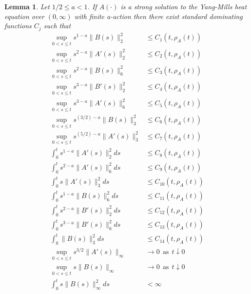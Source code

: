 \documentclass[12pt]{article}
\newtheorem{lemma}[theorem]{Lemma}
\numberwithin{equation}{section}
\begin{document}
\begin{lemma}\label{lemiby} 
Let $1/2 \le a <1$.  If $A(\cdot)$ is a strong solution to the 
      Yang-Mills heat equation over $(0, \infty)$  
   with finite a-action then  there 
      exist standard dominating functions $C_j$ such that
   \begin{align}
   \sup_{0< s \le t} s^{1-a} \|B(s)\|_2^2 &\le C_1(t, \rho_A(t))    \label{iby1} \\                                                                                                 
   \sup_{0< s \le t}s^{2-a} \|A'(s)\|_2^2   &\le C_2(t, \rho_A(t))   \label{iby2}\\                                                                                                    
   \sup_{0< s \le t} s^{2-a} \|B(s)\|_6^2 &\le   C_3(t, \rho_A(t))    \label{iby3}\\                                                                                                   
   \sup_{0< s \le t} s^{3-a} \|B'(s)\|_2^2& \le  C_4(t, \rho_A(t))    \label{iby4}\\    
   \sup_{0< s \le t} s^{3-a} \|A'(s)\|_6^2& \le   C_5(t, \rho_A(t))   \label{iby5}\\  
   \sup_{0< s \le t} s^{(3/2) -a} \|B(s)\|_3^2        &\le    C_6(t, \rho_A(t))   \label{iby6}\\
   \sup_{0< s \le t} s^{(5/2) -a} \|A'(s)\|_3^2      & \le  C_7(t, \rho_A(t))      \label{iby7}\\
   \int_0^t s^{1-a} \|A'(s)\|_2^2 ds &\le C_8(t, \rho_A(t))           \label{iby8}\\
   \int_0^t s^{2-a} \|A'(s)\|_6^2 ds & \le C_9(t, \rho_A(t))          \label{iby9}  \\   
   \int_0^t s \|A'(s)\|_3^2 ds &\le  C_{10}(t, \rho_A(t))                  \label{iby10}\\
   \int_0^t s^{1-a} \|B(s)\|_6^2 ds &\le C_{11}(t, \rho_A(t))        \label{iby11} \\
   \int_0^t   s^{2-a} \|B'(s)\|_2^2 ds & \le C_{12}(t, \rho_A(t))  \label{iby12} \\
   \int_0^t s^{3-a} \|B'(s)\|_6^2 ds   &  \le C_{13}(t, \rho_A(t))   \label{iby13} \\
   \int_0^t \|B(s)\|_3^2 ds & \le C_{14}(t, \rho_A(t))    \label{iby14}\\
      \sup_{0<s \le t} s^{3/2}\|A'(s)\|_\infty &\rightarrow 0\ \ \text{as}\ \ t\downarrow 0 \label{iby15} \\
    \sup_{0<s \le t} s\|B(s)\|_\infty &\rightarrow 0\ \ \text{as}\ \ t\downarrow 0   \label{iby16} \\
      \int_0^t s \|B(s)\|_\infty^2 ds &< \infty \label{iby17}
   \end{align}
   \end{lemma}        
\end{document}
